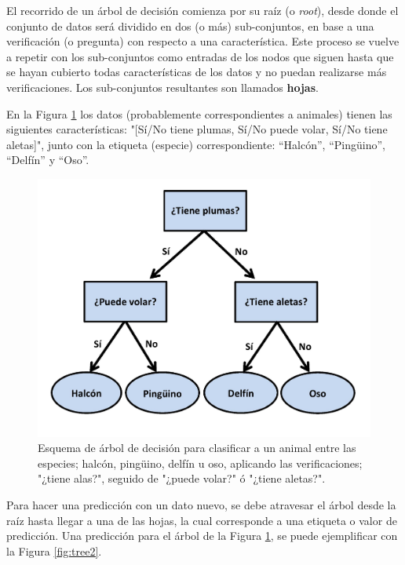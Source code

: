 El recorrido de un árbol de decisión comienza por su raíz (o \emph{root}), desde donde el conjunto de datos será dividido en dos (o más) sub-conjuntos, en base a una verificación (o pregunta) con respecto a una característica.
%
Este proceso se vuelve a repetir con los sub-conjuntos como entradas de los nodos que siguen hasta que se hayan cubierto todas características de los datos y no puedan realizarse más verificaciones. 
%
Los sub-conjuntos resultantes son llamados \textbf{hojas}. 
%

En la Figura \ref{fig:tree1} los datos (probablemente correspondientes a animales) tienen las siguientes características: "[Sí/No tiene plumas, Sí/No puede volar, Sí/No tiene aletas]", junto con la etiqueta (especie) correspondiente: ``Halcón'', ``Pingüino'', ``Delfín'' y ``Oso''.

\begin{figure}[h]
  \centering
  \includegraphics[width=12cm]{figures/image12.jpg}
  \caption[Esquema de árbol de decisión para clasificar animales.]{Esquema de árbol de decisión para clasificar a un animal entre las especies; halcón, pingüino, delfín u oso, aplicando las verificaciones; "¿tiene alas?", seguido de "¿puede volar?" ó "¿tiene aletas?".
  }
  \label{fig:tree1}
\end{figure}

Para hacer una predicción con un dato nuevo, se debe atravesar el árbol desde la raíz hasta llegar a una de las hojas, la cual corresponde a una etiqueta o valor de predicción. Una predicción para el árbol de la Figura \ref{fig:tree1}, se puede ejemplificar con la Figura \ref{fig:tree2}.

